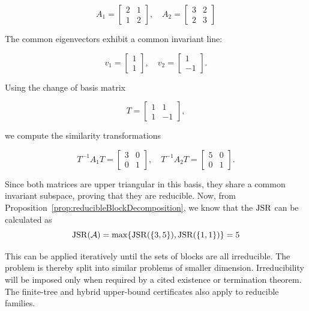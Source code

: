 \begin{example}
    \label{ex:reducibleMatricesBlockForm}
    \[
        A_1 = \begin{bmatrix} 2 & 1 \\ 1 & 2 \end{bmatrix}, \quad
        A_2 = \begin{bmatrix} 3 & 2 \\ 2 & 3 \end{bmatrix}
    \]

    The common eigenvectors exhibit a common invariant line:

    \[
        v_1 = \begin{bmatrix} 1 \\ 1 \end{bmatrix}, \quad
        v_2 = \begin{bmatrix} 1 \\ -1 \end{bmatrix}.
    \]

    Using the change of basis matrix

    \[
        T = \begin{bmatrix} 1 & 1 \\ 1 & -1 \end{bmatrix},
    \]

    we compute the similarity transformations

    \[
        T^{-1} A_1 T = \begin{bmatrix} 3 & 0 \\ 0 & 1 \end{bmatrix}, \quad
        T^{-1} A_2 T = \begin{bmatrix} 5 & 0 \\ 0 & 1 \end{bmatrix}.
    \]

    Since both matrices are upper triangular in this basis, they share a common invariant subspace, proving that they are reducible.
    Now, from Proposition~\ref{prop:reducibleBlockDecomposition}, we know that the $\operatorname{JSR}$ can be calculated as
    \[
        \operatorname{JSR}(\mathcal{A}) = \max \{ \operatorname{JSR}(\{3,5\}), \operatorname{JSR}(\{1,1\})\} = 5
    \]
\end{example}

This can be applied iteratively until the sets of blocks are all irreducible.
The problem is thereby split into similar problems of smaller dimension.
Irreducibility will be imposed only when required by a cited existence or termination theorem.
The finite-tree and hybrid upper-bound certificates also apply to reducible families.

